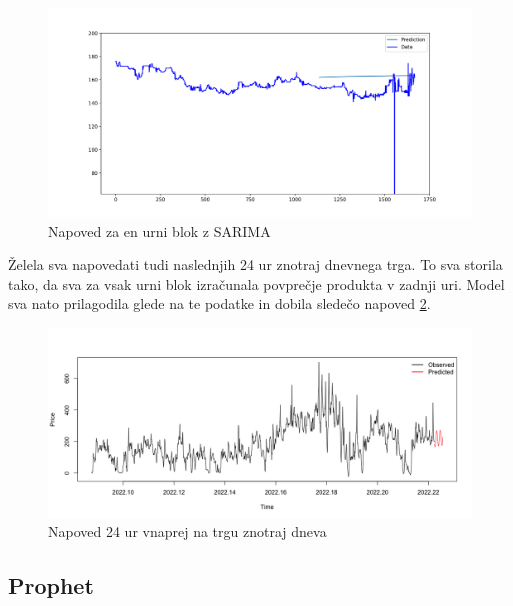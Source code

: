 \documentclass[12pt,a4paper]{amsart}
\theoremstyle{definition} %
\theoremstyle{plain} %
\begin{document}
\begin{figure}[h]
    \centering
    \includegraphics[scale=0.45]{Arima.png}
    \caption{Napoved za en urni blok z SARIMA}
    \label{fig:Arima}
\end{figure}



Želela sva napovedati tudi naslednjih 24 ur znotraj dnevnega trga. To sva storila tako, da sva za vsak urni blok izračunala povprečje produkta v zadnji uri. Model sva nato prilagodila glede na te podatke in dobila sledečo napoved 
\ref{fig:Prediction_intraday}.

\begin{figure}[h]
    \centering
    \includegraphics[scale=0.35]{Prediciton_intraday.png}
    \caption{Napoved 24 ur vnaprej na trgu znotraj dneva}
    \label{fig:Prediction_intraday}
\end{figure}



\subsection{Prophet}
\end{document}
